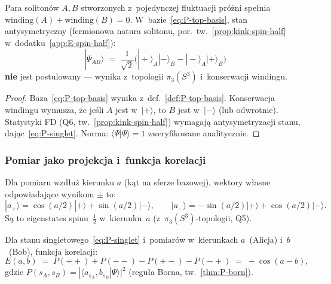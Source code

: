 \begin{proposition}%
\label{prop:P-singlet}
Para solitonów $A, B$ stworzonych z~pojedynczej fluktuacji próżni
spełnia $\mathrm{winding}(A) + \mathrm{winding}(B) = 0$.
W~bazie~\eqref{eq:P-top-basis}, stan antysymetryczny
(fermionowa natura solitonu, por.\ tw.~\ref{prop:kink-spin-half}
w~dodatku~\ref{app:E-spin-half}):
\begin{equation}\label{eq:P-singlet}
  \boxed{
    |\Psi_{AB}\rangle
    \;=\; \frac{1}{\sqrt{2}}\bigl(
      |+\rangle_A|-\rangle_B - |-\rangle_A|+\rangle_B
    \bigr)
  }
\end{equation}
\textbf{nie} jest postulowany --- wynika z~topologii $\pi_3(S^3)$
i~konserwacji windingu.
\end{proposition}

\begin{proof}
Baza~\eqref{eq:P-top-basis} wynika z~def.~\ref{def:P-top-basis}.
Konserwacja windingu wymusza, że jeśli $A$ jest w~$|+\rangle$,
to $B$ jest w~$|-\rangle$ (lub odwrotnie). Statystyki FD
(Q6, tw.~\ref{prop:kink-spin-half}) wymagają antysymetryzacji
stanu, dając~\eqref{eq:P-singlet}. Norma: $\langle\Psi|\Psi\rangle = 1$
zweryfikowane analitycznie.
\end{proof}

\subsubsection{Pomiar jako projekcja i~funkcja korelacji}%
\label{sssec:P-correlation}

\begin{definition}\label{def:P-meas-vectors}
Dla pomiaru wzdłuż kierunku $a$ (kąt na sferze bazowej),
wektory własne odpowiadające wynikom $\pm$ to:
\begin{equation}\label{eq:P-eigenvectors}
  |a_+\rangle = \cos(a/2)|+\rangle + \sin(a/2)|-\rangle,
  \qquad
  |a_-\rangle = -\sin(a/2)|+\rangle + \cos(a/2)|-\rangle.
\end{equation}
Są to eigenstates spinu~$\tfrac{1}{2}$ w~kierunku~$a$
(z~$\pi_3(S^3)$-topologii, Q5).
\end{definition}

\begin{theorem}\label{thm:P-correlation}
Dla stanu singletowego~\eqref{eq:P-singlet} i~pomiarów w~kierunkach
$a$~(Alicja) i~$b$~(Bob), funkcja korelacji:
\begin{equation}\label{eq:P-E-ab}
  E(a, b) \;=\; P(++) + P(--) - P(+-) - P(-+)
  \;=\; -\cos(a - b),
\end{equation}
gdzie $P(s_A, s_B) = |\langle a_{s_A}, b_{s_B}|\Psi\rangle|^2$
(reguła Borna, tw.~\ref{thm:P-born}).
\end{theorem}

